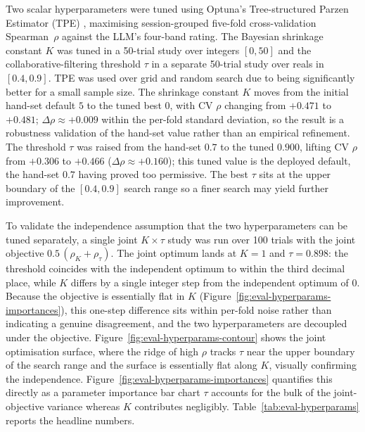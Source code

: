 Two scalar hyperparameters were tuned using Optuna's Tree-structured Parzen Estimator (TPE) \cite{NIPS2011_86e8f7ab, akibaOptunaNextgenerationHyperparameter2019}, maximising session-grouped five-fold cross-validation Spearman~$\rho$ against the LLM's four-band rating. 
The Bayesian shrinkage constant $K$ was tuned in a 50-trial study over integers $[0,50]$ and the collaborative-filtering threshold $\tau$ in a separate 50-trial study over reals in $[0.4, 0.9]$. 
TPE was used over grid and random search due to being significantly better for a small sample size. The shrinkage constant $K$ moves from the initial hand-set default $5$ to the tuned best $0$, with CV $\rho$ changing from $+0.471$ to $+0.481$; $\Delta\rho \approx +0.009$ within the per-fold standard deviation, so the result is a robustness validation of the hand-set value rather than an empirical refinement.
The threshold $\tau$ was raised from the hand-set $0.7$ to the tuned $0.900$, lifting CV $\rho$ from $+0.306$ to $+0.466$ ($\Delta\rho \approx +0.160$); this tuned value is the deployed default, the hand-set $0.7$ having proved too permissive.
The best $\tau$ sits at the upper boundary of the $[0.4, 0.9]$ search range so a finer search may yield further improvement. 


To validate the independence assumption that the two hyperparameters can be tuned separately, a single joint $K \times \tau$ study was run over 100 trials with the joint objective $0.5\,(\rho_K + \rho_\tau)$.  
The joint optimum lands at $K = 1$ and $\tau = 0.898$: the threshold coincides with the independent optimum to within the third decimal place, while $K$ differs by a single integer step from the independent optimum of $0$. Because the objective is essentially flat in $K$ (Figure~\ref{fig:eval-hyperparams-importances}), this one-step difference sits within per-fold noise rather than indicating a genuine disagreement, and the two hyperparameters are decoupled under the objective. 
Figure~\ref{fig:eval-hyperparams-contour} shows the joint optimisation surface, where the ridge of high $\rho$ tracks $\tau$ near the upper boundary of the search range and the surface is essentially flat along $K$, visually confirming the independence. 
Figure~\ref{fig:eval-hyperparams-importances} quantifies this directly as a parameter importance bar chart $\tau$ accounts for the bulk of the joint-objective variance whereas $K$ contributes negligibly. Table~\ref{tab:eval-hyperparams} reports the headline numbers.


